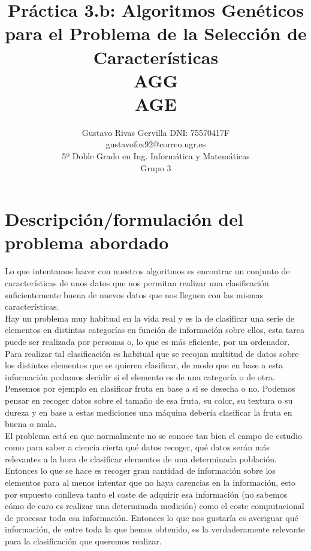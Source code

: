 \documentclass[10pt,a4paper]{article}
\author{Gustavo Rivas Gervilla DNI: 75570417F \\ gustavofox92@correo.ugr.es \\5º Doble Grado en Ing. Informática y Matemáticas \\Grupo 3}
\title{Práctica 3.b: Algoritmos Genéticos para el Problema de la Selección de Características \\ AGG \\ AGE}
\date{}
\begin{document}
\lstset{language=Python, style=customPy}
\maketitle

\newpage

\tableofcontents

\newpage

\section{\color[rgb]{0.0,0.0,0.21}Descripción/formulación del problema abordado}
Lo que intentamos hacer con nuestros algoritmos es encontrar un conjunto de características de unos datos que nos permitan realizar una clasificación suficientemente buena de nuevos datos que nos lleguen con las mismas características.\\

Hay un problema muy habitual en la vida real y es la de clasificar una serie de elementos en distintas categorías en función de información sobre ellos, esta tarea puede ser realizada por personas o, lo que es más eficiente, por un ordenador. Para realizar tal clasificación es habitual que se recojan multitud de datos sobre los distintos elementos que se quieren clasificar, de modo que en base a esta información podamos decidir si el elemento es de una categoría o de otra. Pensemos por ejemplo en clasificar fruta en base a si se desecha o no. Podemos pensar en recoger datos sobre el tamaño de esa fruta, su color, su textura o su dureza y en base a estas mediciones una máquina debería clasificar la fruta en buena o mala.\\

El problema está en que normalmente no se conoce tan bien el campo de estudio como para saber a ciencia cierta qué datos recoger, qué datos serán más relevantes a la hora de clasificar elementos de una determinada población. Entonces lo que se hace es recoger gran cantidad de información sobre los elementos para al menos intentar que no haya carencias en la información, esto por supuesto conlleva tanto el coste de adquirir esa información (no sabemos cómo de caro es realizar una determinada medición) como el coste computacional de procesar toda esa información. Entonces lo que nos gustaría es averiguar qué información, de entre toda la que hemos obtenido, es la verdaderamente relevante para la clasificación que queremos realizar.\\
\end{document}
